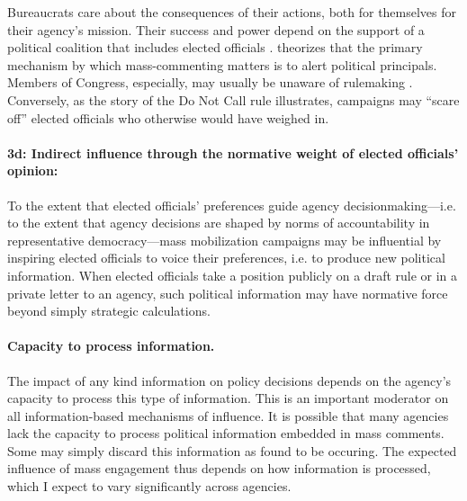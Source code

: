 Bureaucrats care about the consequences of their actions, both for themselves for their agency’s mission. Their success and power depend on the support of a political coalition that includes elected officials \citep{Carpenter2001}. \citet{West2004} theorizes that the primary mechanism by which mass-commenting matters is to alert political principals. Members of Congress, especially, may usually be unaware of rulemaking \citep{Nou2016}. Conversely, as the story of the Do Not Call rule illustrates, campaigns may ``scare off'' elected officials who otherwise would have weighed in.%



\paragraph{3d: Indirect influence through the normative weight of elected officials' opinion:} 
To the extent that elected officials' preferences guide agency decisionmaking---i.e. to the extent that agency decisions are shaped by norms of accountability in representative democracy---mass mobilization campaigns may be influential by inspiring elected officials to voice their preferences, i.e. to produce new political information. When elected officials take a position publicly on a draft rule or in a private letter to an agency, such political information may have normative force beyond simply strategic calculations.


\paragraph{Capacity to process information.} The impact of any kind information on policy decisions depends on the agency's capacity to process this type of information. This is an important moderator on all information-based mechanisms of influence.
It is possible that many agencies lack the capacity to process political information embedded in mass comments. Some may simply discard this information as \citet{Mendelson2011} found to be occuring. The expected influence of mass engagement thus depends on how information is processed, which I expect to vary significantly across agencies. %



